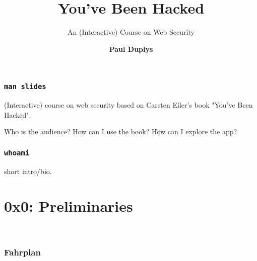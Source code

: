 \documentclass[aspectratio=169]{beamer}
\title{\textbf{You've Been Hacked}}
\subtitle{An (Interactive) Course on Web Security\newline\vfill}
\author{\textbf{Paul Duplys}}
\institute[]{\faTwitter\hspace{0.1cm} @duplys \hspace{1cm} \faGithub\hspace{0.1cm} duplys \hspace{1cm} \faLinkedinSquare\hspace{0.1cm} linkedin.com/in/paulduplys/}
\date{}
\begin{document}
{
\begin{frame}
    \titlepage
\end{frame}
}

\begin{frame}
    \tableofcontents
\end{frame}

\begin{frame}
    \frametitle{\texttt{man slides}}

    (Interactive) course on web security based on Carsten Eiler's book "You've Been Hacked".
    
    Who is the audience? How can I use the book? How can I explore the app?
\end{frame}

\begin{frame}
    \frametitle{\texttt{whoami}}
    short intro/bio.
\end{frame}


\section{0x0: Preliminaries}

{
\begin{frame}
\huge{\textcolor{white}{\textbf{0x0: Preliminaries}}}
\end{frame}
}




\begin{frame}
    \frametitle{Fahrplan}

    \begin{itemize}

    \end{itemize}

\end{frame}

\end{document}
